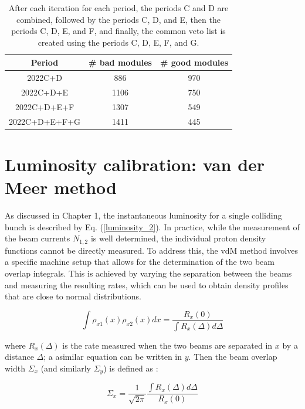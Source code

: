 \begin{table}[ht]
\centering
\caption{After each iteration for each period, the periods C and D are combined, followed by the periods C, D, and E, then the periods C, D, E, and F, and finally, the common veto list is created using the periods C, D, E, F, and G.}
\begin{tabular}{ccc}
\textbf{Period} & \textbf{\# bad modules} & \textbf{\# good modules}  \\ 
\toprule
2022C+D         & 886                     & 970                       \\
2022C+D+E       & 1106                    & 750                       \\
2022C+D+E+F     & 1307                    & 549                       \\
2022C+D+E+F+G   & 1411                    & 445                   
\label{common  veto module}   
\end{tabular}
\end{table}


\section{Luminosity calibration: van der Meer method}

As discussed in Chapter 1, the instantaneous luminosity for a single colliding bunch is described by Eq. (\ref{luminosity_2}). In practice, while the measurement of the beam currents $N_{1,2}$ is well determined, the individual proton density functions cannot be directly measured. To address this, the vdM method involves a specific machine setup that allows for the determination of the two beam overlap integrals. This is achieved by varying the separation between the beams and measuring the resulting rates, which can be used to obtain density profiles that are close to normal distributions.

\begin{equation}
\int \rho_{x1}(x) \rho_{x2}(x) dx = \frac{R_{x}(0)}{\int R_{x}(\Delta) d\Delta}
\end{equation}

where $R_{x}(\Delta)$ is the rate measured when the two beams are separated in $x$ by a distance $\Delta$; a asimilar equation can be written in $y$. Then the beam overlap width $\Sigma_{x}$ (and similarly $\Sigma_{y}$) is defined as \cite{pas_18}:

\begin{equation}
\Sigma_{x}= \frac{1}{\sqrt{2\pi}} \frac{\int R_{x}(\Delta)d\Delta}{R_{x}(0)}
\label{CapSigma}
\end{equation}

